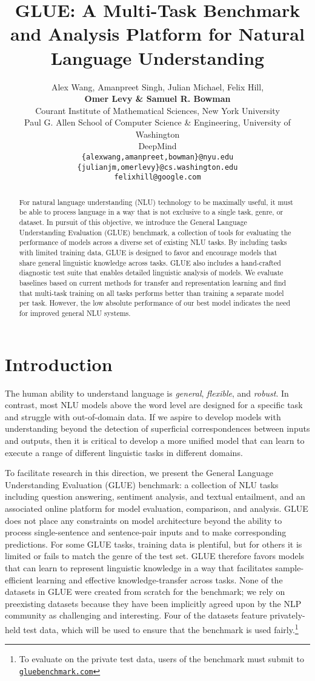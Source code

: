 \documentclass{article} \usepackage{iclr2019_conference,times}
\title{GLUE: A Multi-Task Benchmark and Analysis Platform for Natural Language Understanding}
\author{Alex Wang, Amanpreet Singh, Julian Michael, Felix Hill, \\ \textbf{Omer Levy \& Samuel R. Bowman} \\
Courant Institute of Mathematical Sciences, New York University\\
Paul G. Allen School of Computer Science \& Engineering, University of Washington\\
DeepMind\\
\texttt{\{alexwang,amanpreet,bowman\}@nyu.edu} \\
\texttt{\{julianjm,omerlevy\}@cs.washington.edu} \\
\texttt{felixhill@google.com}
}
\begin{document}
\maketitle

\begin{abstract}
For natural language understanding (NLU) technology to be maximally useful, it must be able to process language in a way that is not exclusive to a single task, genre, or dataset.
In pursuit of this objective, we introduce the General Language Understanding Evaluation (GLUE) benchmark, a collection of tools for evaluating the performance of models across a diverse set of existing NLU tasks.
By including tasks with limited training data, GLUE is designed to favor and encourage models that share general linguistic knowledge across tasks.
GLUE also includes a hand-crafted diagnostic test suite that enables detailed linguistic analysis of models.
We evaluate baselines based on current methods for transfer and representation learning and find that multi-task training on all tasks performs better than training a separate model per task. However, the low absolute performance of our best model indicates the need for improved general NLU systems. 
\end{abstract}


\section{Introduction}\label{sec:intro}

The human ability to understand language is \emph{general}, \textit{flexible}, and \textit{robust}. 
In contrast, most NLU models above the word level are designed for a specific task and struggle with out-of-domain data. 
If we aspire to develop models with understanding beyond the detection of superficial correspondences between inputs and outputs, 
then it is critical to develop a more unified model that can learn to execute a range of different linguistic tasks in different domains.

To facilitate research in this direction, we present the General Language Understanding Evaluation 
(GLUE)
benchmark: a collection of NLU tasks including question answering, sentiment analysis, and textual entailment, and an associated online platform for model evaluation, comparison, and analysis.
GLUE does not place any constraints on model architecture beyond the ability to process single-sentence and sentence-pair inputs and to make corresponding predictions. 
For some GLUE tasks, training data is plentiful, but for others it is limited or fails to match the genre of the test set. GLUE therefore favors models that can learn to represent linguistic knowledge in a way that facilitates sample-efficient learning and effective knowledge-transfer across tasks. 
None of the datasets in GLUE were created from scratch for the benchmark; we rely on preexisting datasets because they have been implicitly agreed upon by the NLP community as challenging and interesting.
Four of the datasets feature privately-held test data, which will be used to ensure that the benchmark is used fairly.\footnote{To evaluate on the private test data, users of the benchmark must submit to \texttt{\href{gluebenchmark.com}{gluebenchmark.com}}}
\end{document}
